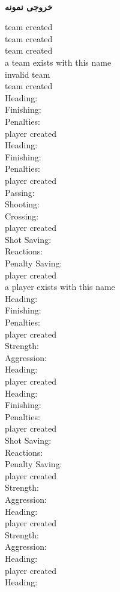 \documentclass[]{article}
\newcommand{\outputsample}[1]{
    ~\\
    \textbf{خروجی نمونه}

    \begin{tcolorbox}[breakable,boxrule=0pt]
        \begin{latin}
            \large{
                #1
            }
        \end{latin}
    \end{tcolorbox}
}
\begin{document}
\outputsample{
team created\\
team created\\
team created\\
a team exists with this name\\
invalid team\\
team created\\
Heading:\\
Finishing:\\
Penalties:\\
player created\\
Heading:\\
Finishing:\\
Penalties:\\
player created\\
Passing:\\
Shooting:\\
Crossing:\\
player created\\
Shot Saving:\\
Reactions:\\
Penalty Saving:\\
player created\\
a player exists with this name\\
Heading:\\
Finishing:\\
Penalties:\\
player created\\
Strength:\\
Aggression:\\
Heading:\\
player created\\
Heading:\\
Finishing:\\
Penalties:\\
player created\\
Shot Saving:\\
Reactions:\\
Penalty Saving:\\
player created\\
Strength:\\
Aggression:\\
Heading:\\
player created\\
Strength:\\
Aggression:\\
Heading:\\
player created\\
Heading:\\
}
\end{document}
